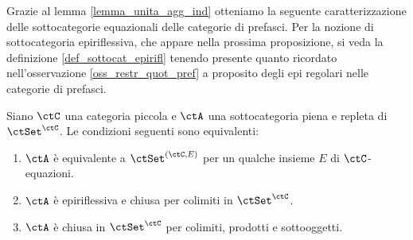 Grazie al lemma \ref{lemma_unita_agg_ind} otteniamo la seguente caratterizzazione delle sottocategorie equazionali delle
categorie di prefasci. Per la nozione di sottocategoria	 epiriflessiva, che appare nella prossima proposizione, si veda la
definizione \ref{def_sottocat_epirifl} tenendo presente quanto ricordato nell'osservazione \ref{oss_restr_quot_pref} a proposito
degli epi regolari nelle categorie di prefasci.

\begin{proposition}\label{prop_stc_equaz_pref}
 Siano \(\ctC\) una categoria piccola e \(\ctA\) una sottocategoria piena e repleta di \(\ctSet^\ctC\).
 Le condizioni seguenti sono equivalenti:
 \begin{enumerate}
  \item \(\ctA\) è equivalente a \(\ctSet^{(\ctC,E)}\) per un qualche insieme \(E\) di \(\ctC\)-equazioni.
  \item \(\ctA\) è epiriflessiva e chiusa per colimiti in \(\ctSet^\ctC\).
  \item \(\ctA\) è chiusa in \(\ctSet^\ctC\) per colimiti, prodotti e sottooggetti.
 \end{enumerate}
\end{proposition}

